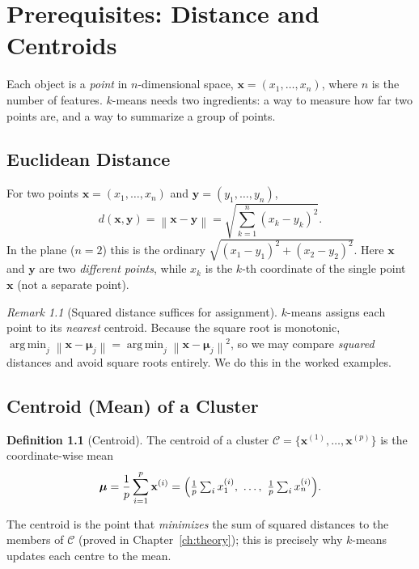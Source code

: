 \documentclass[11pt,a4paper]{report}
\theoremstyle{definition}
\newtheorem{definition}{Definition}[chapter]
\theoremstyle{plain}
\theoremstyle{remark}
\newtheorem*{remark}{Remark}
\newcommand{\vx}{\mathbf{x}}
\newcommand{\vy}{\mathbf{y}}
\newcommand{\vmu}{\bm{\mu}}
\newcommand{\C}{\mathcal{C}}
\newcommand{\norm}[1]{\left\lVert #1 \right\rVert}
\DeclareMathOperator*{\argmin}{arg\,min}
\begin{document}
	\chapter{Prerequisites: Distance and Centroids}
	
	Each object is a \emph{point} in $n$-dimensional space, $\vx=(x_1,\dots,x_n)$,
	where $n$ is the number of features. $k$-means needs two ingredients: a way to
	measure how far two points are, and a way to summarize a group of points.
	
	\section{Euclidean Distance}
	For two points $\vx=(x_1,\dots,x_n)$ and $\vy=(y_1,\dots,y_n)$,
	\begin{equation}
		d(\vx,\vy)=\norm{\vx-\vy}=\sqrt{\sum_{k=1}^{n}(x_k-y_k)^2}.
		\label{eq:euclid}
	\end{equation}
	In the plane ($n=2$) this is the ordinary
	$\sqrt{(x_1-y_1)^2+(x_2-y_2)^2}$. Here $\vx$ and $\vy$ are two \emph{different
		points}, while $x_k$ is the $k$-th coordinate of the single point $\vx$ (not a
	separate point).
	
	\begin{remark}[Squared distance suffices for assignment]
		$k$-means assigns each point to its \emph{nearest} centroid. Because the square
		root is monotonic, $\argmin_j\norm{\vx-\vmu_j}=\argmin_j\norm{\vx-\vmu_j}^2$, so
		we may compare \emph{squared} distances and avoid square roots entirely. We do
		this in the worked examples.
	\end{remark}
	
	\section{Centroid (Mean) of a Cluster}
	\begin{definition}[Centroid]
		The centroid of a cluster $\C=\{\vx^{(1)},\dots,\vx^{(p)}\}$ is the coordinate-wise
		mean
		\begin{equation}
			\vmu=\frac{1}{p}\sum_{i=1}^{p}\vx^{(i)}
			=\Bigl(\tfrac1p\textstyle\sum_i x^{(i)}_1,\ \dots,\ \tfrac1p\sum_i x^{(i)}_n\Bigr).
			\label{eq:centroid}
		\end{equation}
	\end{definition}
	The centroid is the point that \emph{minimizes} the sum of squared distances to
	the members of $\C$ (proved in Chapter~\ref{ch:theory}); this is precisely why
	$k$-means updates each centre to the mean.
	
\end{document}
